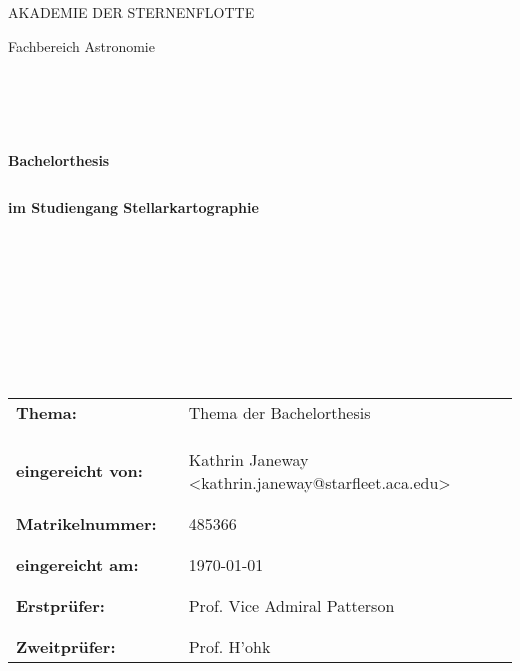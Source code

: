\begin{titlepage}
	\begin{center}
		\uppercase{\large Akademie der Sternenflotte}\\
	\end{center}
	\begin{center}
		\large Fachbereich Astronomie
	\end{center}
	\begin{verbatim}





	\end{verbatim}
	\begin{center}
		\textbf{\large Bachelorthesis}
	\end{center}
	\begin{verbatim}
	\end{verbatim}
	\begin{center}
		\textbf{im Studiengang Stellarkartographie}
	\end{center}
	\begin{verbatim}










	\end{verbatim}
	\begin{flushleft}
		\begin{tabular}{lll}
			\textbf{Thema:} & & {Thema der Bachelorthesis} \\
			& & \\
			& & \\
			& & \\
			\textbf{eingereicht von:} & & Kathrin Janeway <kathrin.janeway@starfleet.aca.edu>\\
			& & \\
			& & \\
			\textbf{Matrikelnummer:} & & 485366\\
			& & \\
			& & \\
			\textbf{eingereicht am:} & & \today\\
			& & \\
			& & \\
			\textbf{Erstprüfer:} & & Prof. Vice Admiral Patterson \\
			& & \\
			& & \\
			\textbf{Zweitprüfer:} & & Prof. H'ohk
		\end{tabular}
	\end{flushleft}
\end{titlepage}
